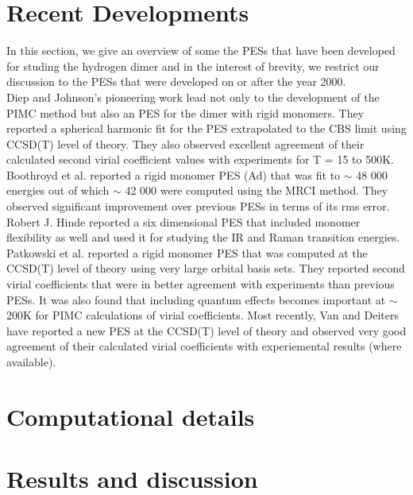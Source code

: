     \section{Recent Developments}
        In this section, we give an overview of some the \abInitio PESs that have been developed for studing the hydrogen dimer and in the interest of brevity, we restrict our discussion to the PESs that were developed on or after the year 2000.\\
 
        Diep and Johnson's \cite{Diep2000} pioneering work lead not only to the development of the PIMC method but also an \abInitio PES for the dimer with rigid monomers. They reported a spherical harmonic fit for the PES extrapolated to the CBS limit using CCSD(T) level of theory. They also observed excellent agreement of their calculated second virial coefficient values with experiments for T = 15 to 500K. Boothroyd et al. \cite{Boothroyd2002} reported a rigid monomer PES (Ad) that was fit to $\sim$ 48 000 \abInitio energies out of which $\sim$ 42 000 were computed using the MRCI method. They observed significant improvement over previous PESs in terms of its rms error. Robert J. Hinde \cite{Hinde2008} reported a six dimensional PES that included monomer flexibility as well and used it for studying the IR and Raman transition energies. Patkowski et al. \cite{Patkowski2008} reported a rigid monomer PES that was computed at the CCSD(T) level of theory using very large orbital basis sets. They reported second virial coefficients that were in better agreement with experiments than previous PESs. It was also found that including quantum effects becomes important at $\sim$ 200K for PIMC calculations of virial coefficients. Most recently, Van and Deiters \cite{Tat2015} have reported a new \abInitio PES at the CCSD(T) level of theory and observed very good agreement of their calculated virial coefficients with experiemental results (where available). 
    \section{Computational details}
    \section{Results and discussion}
